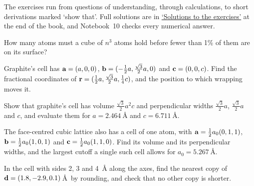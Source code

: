 \label{sec:md-exercises}

The exercises run from questions of understanding, through calculations,
to short derivations marked `show that'. Full solutions are in
\hyperref[sec:md-solutions]{`Solutions to the exercises'} at the end of
the book, and Notebook~10 checks every numerical answer.

\begin{exercise}
\label{ex:md-surface}
How many atoms must a cube of $n^3$ atoms hold before fewer than 1\% of
them are on its surface?
\end{exercise}

\begin{exercise}
\label{ex:md-fractional}
Graphite's cell has $\bm{\mathrm{a}} = (a, 0, 0)$, $\bm{\mathrm{b}} = (-\frac12a,
\frac{\sqrt3}2a, 0)$ and $\bm{\mathrm{c}} = (0, 0, c)$. Find the fractional
coordinates of $\bm{\mathrm{r}} = (\frac12a, \frac{\sqrt3}2a, \frac14c)$, and the
position to which wrapping moves it.
\end{exercise}

\begin{exercise}
\label{ex:md-graphite}
Show that graphite's cell has volume $\frac{\sqrt3}2a^2c$ and
perpendicular widths $\frac{\sqrt3}2a$, $\frac{\sqrt3}2a$ and $c$, and
evaluate them for $a = \SI{2.464}{\angstrom}$ and $c =
\SI{6.711}{\angstrom}$.
\end{exercise}

\begin{exercise}
\label{ex:md-primitive}
The face-centred cubic lattice also has a cell of one atom, with $\bm{\mathrm{a}} =
\frac12a_0(0, 1, 1)$, $\bm{\mathrm{b}} = \frac12a_0(1, 0, 1)$ and $\bm{\mathrm{c}} =
\frac12a_0(1, 1, 0)$. Find its volume and its perpendicular widths, and
the largest cutoff a single such cell allows for $a_0 =
\SI{5.267}{\angstrom}$.
\end{exercise}

\begin{exercise}
\label{ex:md-round}
In the cell with sides 2, 3 and \SI{4}{\angstrom} along the axes, find the
nearest copy of $\bm{\mathrm{d}} = (1.8, -2.9, 0.1)$\,\AA\ by rounding, and check
that no other copy is shorter.
\end{exercise}

